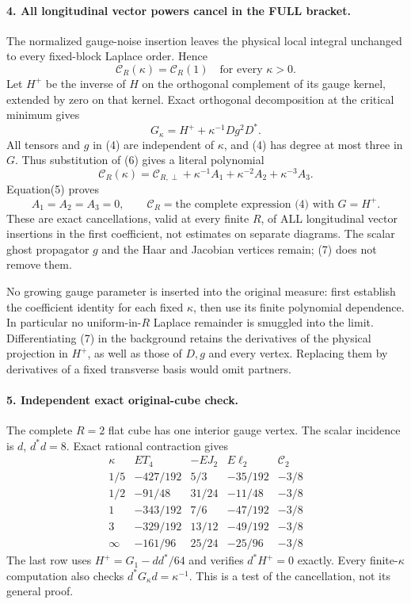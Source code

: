 \documentclass[11pt]{article}
\begin{document}
\paragraph{4. All longitudinal vector powers cancel in the FULL bracket.}
The normalized gauge-noise insertion leaves the physical local integral
unchanged to every fixed-block Laplace order. Hence
\[
 \mathcal C_R(\kappa)=\mathcal C_R(1)\quad\text{for every }\kappa>0.
                                                                    \tag{5}
\]
Let $H^+$ be the inverse of $H$ on the orthogonal complement of its gauge
kernel, extended by zero on that kernel. Exact orthogonal decomposition
at the critical minimum gives
\[
 G_\kappa=H^++\kappa^{-1}Dg^2D^*.                                 \tag{6}
\]
All tensors and $g$ in (4) are independent of $\kappa$, and (4) has degree
at most three in $G$. Thus substitution of (6) gives a literal polynomial
\[
 \mathcal C_R(\kappa)=\mathcal C_{R,\perp}
       +\kappa^{-1}A_1+\kappa^{-2}A_2+\kappa^{-3}A_3.
\]
Equation(5) proves
\[
 \boxed{A_1=A_2=A_3=0,\qquad
 \mathcal C_R=\text{the complete expression (4) with }G=H^+.}      \tag{7}
\]
These are exact cancellations, valid at every finite $R$, of ALL
longitudinal vector insertions in the first coefficient, not estimates
on separate diagrams. The scalar ghost propagator $g$ and the Haar and
Jacobian vertices remain; (7) does not remove them.

No growing gauge parameter is inserted into the original measure:
first establish the coefficient identity for each fixed $\kappa$, then
use its finite polynomial dependence. In particular no uniform-in-$R$
Laplace remainder is smuggled into the limit. Differentiating (7) in the
background retains the derivatives of the physical projection in $H^+$,
as well as those of $D,g$ and every vertex. Replacing them by derivatives
of a fixed transverse basis would omit partners.

\paragraph{5. Independent exact original-cube check.}
The complete $R=2$ flat cube has one interior gauge vertex. The scalar
incidence is $d$, $d^*d=8$. Exact rational contraction gives
\[
\begin{array}{c|r|r|r|r}
\kappa&ET_4&-EJ_2&E\ell_2&\mathcal C_2\\\hline
1/5&-427/192&5/3&-35/192&-3/8\\
1/2&-91/48&31/24&-11/48&-3/8\\
1&-343/192&7/6&-47/192&-3/8\\
3&-329/192&13/12&-49/192&-3/8\\
\infty&-161/96&25/24&-25/96&-3/8
\end{array}
\]
The last row uses $H^+=G_1-dd^*/64$ and verifies $d^*H^+=0$ exactly.
Every finite-$\kappa$ computation also checks $d^*G_\kappa d=\kappa^{-1}$.
This is a test of the cancellation, not its general proof.
\end{document}
